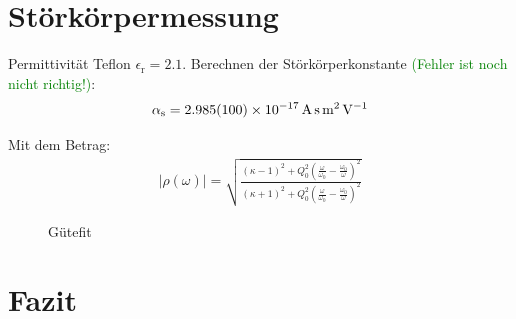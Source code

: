 \documentclass[11pt, a4paper]{scrbook}
\newcommand{\todo}[1]{{\textcolor{Green}{(#1)}}}
\begin{document}
	\chapter{Störkörpermessung}
	Permittivität Teflon \cite{CRC} $\epsilon_\mathrm{r} = \num{2.1}$.
	Berechnen der Störkörperkonstante \todo{Fehler ist noch nicht richtig!}:
	\begin{align}
		\alpha_\mathrm{s} = \SI{2.985 +- 0.1e-17}{\ampere\second\metre\squared\per\volt}
	\end{align}


	
	Mit dem Betrag:
	\begin{align}
		| \rho(\omega) | = \sqrt{\frac{(\kappa - 1)^2 + Q_0^2 \left( \frac{\omega}{\omega_0}  - \frac{\omega_0}{\omega}\right)^2}{(\kappa + 1)^2 + Q_0^2 \left( \frac{\omega}{\omega_0}  - \frac{\omega_0}{\omega}\right)^2}}
	\end{align}
	\begin{figure}[ht]
		\centering
		
		\caption{Gütefit}
		\label{fig:gütefit}
	\end{figure}
	
	
	
	
	\chapter{Fazit}
	     
	\appendix
\end{document}

